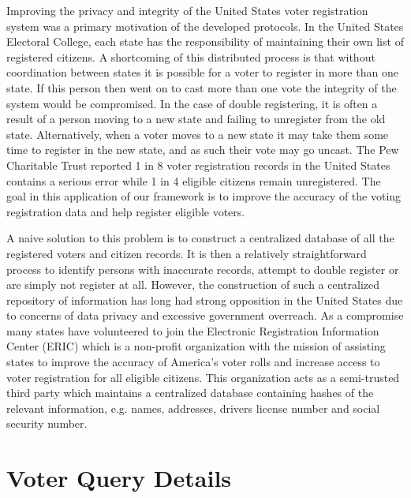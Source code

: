 \documentclass[11pt,letterpaper]{article}
\begin{document}
Improving the privacy and integrity of the United States voter registration system was a primary motivation of the developed protocols. In  the United States Electoral College, each state has the responsibility of maintaining their own list of registered citizens. A shortcoming of this distributed process is that without coordination between states it is possible for a voter to register in more than one state. If this person then went on to cast more than one vote the integrity of the system would be compromised. In the case of double registering, it is often a result of a person moving to a new state and failing to unregister from the old state. Alternatively, when a voter moves to a new state it may take them some time to register in the new state, and as such their vote may go uncast. The Pew Charitable Trust\cite{pew} reported 1 in 8 voter registration records in the United States contains a serious error while 1 in 4 eligible citizens remain unregistered. The goal in this application of our framework is to improve the accuracy of the voting registration data and help register eligible voters. 

A naive solution to this problem is to construct a centralized database of all the registered voters and citizen records. It is then a relatively straightforward process to identify persons with inaccurate records, attempt to double register or are simply not register at all. However, the construction of such a centralized repository of information has long had strong opposition in the United States due to concerns of data privacy and  excessive government overreach. As a compromise many states have volunteered to join the Electronic Registration Information Center (ERIC)\cite{eric} which is a non-profit organization with the mission of assisting states to improve the accuracy of America's voter rolls and increase access to voter registration for all eligible citizens. This organization acts as a semi-trusted third party which maintains a centralized database containing hashes of the relevant information, e.g. names, addresses, drivers license number and social security number. 

\iffullversion
\iffullversion
\else

\section{Voter Query Details}\label{sec:voterDetails}
\end{document}
